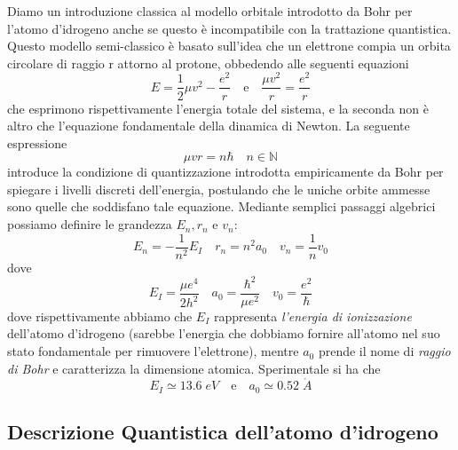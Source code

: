 Diamo un introduzione classica al modello orbitale introdotto da Bohr per l'atomo d'idrogeno anche se questo \`e incompatibile con la trattazione quantistica. Questo modello semi-classico \`e basato sull'idea che un elettrone compia un orbita circolare di raggio r attorno al protone, obbedendo alle seguenti equazioni 
\begin{equation*}
	E = \frac{1}{2}\mu v^2 - \frac{e^2}{r} \quad \text{e} \quad \frac{\mu v^2}{r} = \frac{e^2}{r}
\end{equation*}
che esprimono rispettivamente l'energia totale del sistema, e la seconda non \`e altro che l'equazione fondamentale della dinamica di Newton. La seguente espressione 
\begin{equation*}
	\mu vr = n \hbar \quad n \in \mathbb{N}
\end{equation*}
introduce la condizione di quantizzazione introdotta empiricamente da Bohr per spiegare i livelli discreti dell'energia, postulando che le uniche orbite ammesse sono quelle che soddisfano tale equazione.
Mediante semplici passaggi algebrici possiamo definire le grandezza $E_n, r_n$ e $v_n$:
\begin{equation*}
	E_n = - \frac{1}{n^2}E_I \quad r_n = n^2a_0 \quad v_n = \frac{1}{n}v_0
\end{equation*}
dove 
\begin{equation*}
	E_I = \frac{\mu e^4}{2h^2} \quad a_0 = \frac{\hbar^2}{\mu e^2} \quad v_0 = \frac{e^2}{\hbar}
\end{equation*}
dove rispettivamente abbiamo che $E_I $ rappresenta \textit{l'energia di ionizzazione} dell'atomo d'idrogeno (sarebbe l'energia che dobbiamo fornire all'atomo nel suo stato fondamentale per rimuovere l'elettrone), mentre $a_0$ prende il nome di \textit{raggio di Bohr} e caratterizza la dimensione atomica. Sperimentale si ha che 
\begin{equation*}
	E_I \simeq 13.6 \; eV \quad \text{e} \quad a_0 \simeq 0.52 \; \mathring{A} 
\end{equation*}

\subsection{Descrizione Quantistica dell'atomo d'idrogeno}

